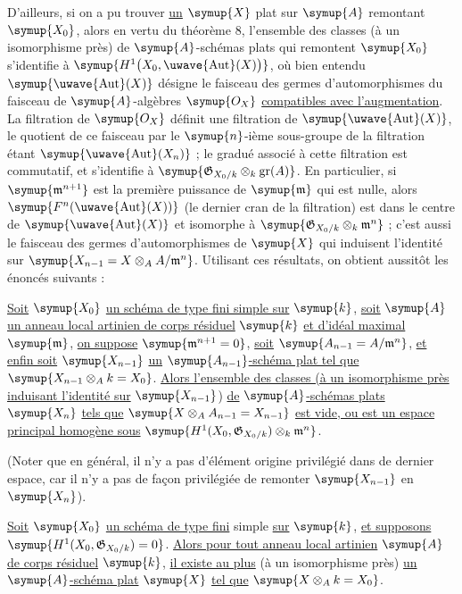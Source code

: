 D'ailleurs, si on a pu trouver \uline{un} $\symup{X}$ plat sur $\symup{A}$ remontant $\symup{X_0}$, alors en
vertu du théorème 8, l'ensemble des classes (à un isomorphisme près) de
$\symup{A}$-schémas plats qui remontent $\symup{X_0}$ s'identifie à
$\symup{H^1\bigl(X_0,\mathop{\text{\uwave{Aut}}}\nolimits(X)\bigr)}$,
où bien entendu $\symup{\mathop{\text{\uwave{Aut}}}\nolimits(X)}$ désigne le faisceau des
germes d'automorphismes du faisceau de $\symup{A}$-algèbres $\symup{O_X}$ \uline{compatibles avec l'augmentation}. La filtration de $\symup{O_X}$ définit une filtration de
$\symup{\mathop{\text{\uwave{Aut}}}\nolimits(X)}$, le quotient de ce faisceau par le
$\symup{n}$-ième sous-groupe de la filtration étant
$\symup{\mathop{\text{\uwave{Aut}}}\nolimits(X_n)}$ ; le gradué associé à cette filtration
est commutatif, et s'identifie à
$\symup{\mathfrak G_{X_0/k}\otimes_k\operatorname{gr}(A)}$. En particulier, si
$\symup{\mathfrak m^{n+1}}$ est la première puissance de $\symup{\mathfrak m}$ qui est nulle,
alors $\symup{F^n(\mathop{\text{\uwave{Aut}}}\nolimits(X))}$ (le dernier cran de la
filtration) est dans le centre de $\symup{\mathop{\text{\uwave{Aut}}}\nolimits(X)}$ et
isomorphe à $\symup{\mathfrak G_{X_0/k}\otimes_k\mathfrak m^n}$ ; c'est aussi le faisceau
des germes d'automorphismes de $\symup{X}$ qui induisent l'identité sur
$\symup{X_{n-1}=X\otimes_A A/\mathfrak m^n}$. Utilisant ces résultats, on obtient
aussitôt les énoncés suivants :

 \uline{Soit} $\symup{X_0}$ \uline{un schéma de type fini simple sur} $\symup{k}$, \uline{soit}
$\symup{A}$ \uline{un anneau local artinien de corps résiduel} $\symup{k}$ \uline{et d'idéal maximal}
$\symup{\mathfrak m}$, \uline{on suppose} $\symup{\mathfrak m^{n+1}=0}$, \uline{soit}
$\symup{A_{n-1}=A/\mathfrak m^n}$, \uline{et enfin soit} $\symup{X_{n-1}}$ \uline{un} $\symup{A_{n-1}}$\uline{-schéma plat
tel que} $\symup{X_{n-1}\otimes_A k=X_0}$. \uline{Alors l'ensemble des classes (à un
isomorphisme près induisant l'identité sur} $\symup{X_{n-1}}$) \uline{de} $\symup{A}$\uline{-schémas plats}
$\symup{X_n}$ \uline{tels que} $\symup{X\otimes_A A_{n-1}=X_{n-1}}$ \uline{est vide, ou est un espace
principal homogène sous}
$\symup{H^1(X_0,\mathfrak G_{X_0/k})\otimes_k\mathfrak m^n}$.

(Noter que en général, il n'y a pas d'élément origine privilégié dans de
dernier espace, car il n'y a pas de façon privilégiée de remonter $\symup{X_{n-1}}$ en
$\symup{X_n}$).

 \uline{Soit} $\symup{X_0}$ \uline{un schéma de type fini} simple \uline{sur} $\symup{k}$, \uline{et
supposons} $\symup{H^1(X_0,\mathfrak G_{X_0/k})=0}$. \uline{Alors pour tout anneau local artinien}
$\symup{A}$ \uline{de corps résiduel} $\symup{k}$, \uline{il existe au plus} (à un isomorphisme près) \uline{un}
$\symup{A}$\uline{-schéma plat} $\symup{X}$ \uline{tel que} $\symup{X\otimes_A k=X_0}$.

